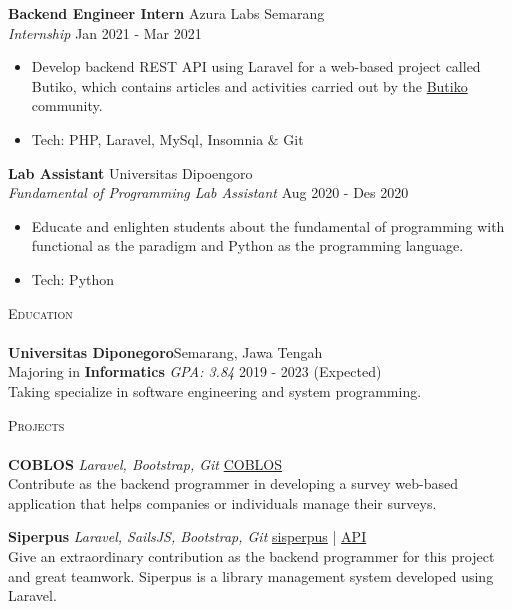 \documentclass[a4paper]{article}
\newcommand{\lineunder} {
    \vspace*{-8pt} \\
    \hspace*{-18pt} \hrulefill \\
}
\newcommand{\header} [1] {
    {\hspace*{-18pt}\vspace*{6pt} \textsc{#1}}
    \vspace*{-6pt} \lineunder
}
\begin{document}
\textbf{Backend Engineer Intern} \hfill Azura Labs Semarang\\
\textit{Internship} \hfill Jan 2021 - Mar 2021\\
\vspace{-1mm}
\begin{itemize} \itemsep 1pt
	\item Develop backend REST API using Laravel for a web-based project called \textquotesingle{}Butiko\textquotesingle{}, which contains articles and activities carried out by the \textquotesingle{}\href{https://butiko.id/}{Butiko}\textquotesingle{} community.
	\item Tech: PHP, Laravel, MySql, Insomnia \& Git
\end{itemize}

\textbf{Lab Assistant} \hfill Universitas Dipoengoro\\
\textit{Fundamental of Programming Lab Assistant} \hfill Aug 2020 - Des 2020\\
\vspace{-1mm}
\begin{itemize} \itemsep 1pt
	\item Educate and enlighten students about the fundamental of programming with functional as the paradigm and Python as the programming language.
	\item Tech: Python
\end{itemize}

\header{Education}
\textbf{Universitas Diponegoro}\hfill Semarang, Jawa Tengah\\
Majoring in \textbf{Informatics} \textit{GPA: 3.84} \hfill 2019 - 2023 (Expected)\\
Taking specialize in software engineering and system programming.
\vspace{2mm}

\header{Projects}
{\textbf{COBLOS}} {\sl Laravel, Bootstrap, Git} \hfill \href{https://coblos.herokuapp.com/}{COBLOS}\\
Contribute as the backend programmer in developing a survey web-based application that helps companies or individuals manage their surveys.\\
\vspace*{2mm}

{\textbf{Siperpus}} {\sl Laravel, SailsJS, Bootstrap, Git} \hfill \href{http://sisperpus.herokuapp.com/}{sisperpus} | \href{https://pbp-siperpus.herokuapp.com/}{API}\\
Give an extraordinary contribution as the backend programmer for this project and great teamwork. Siperpus is a library management system developed using Laravel. \\
\vspace*{2mm}
\end{document}
